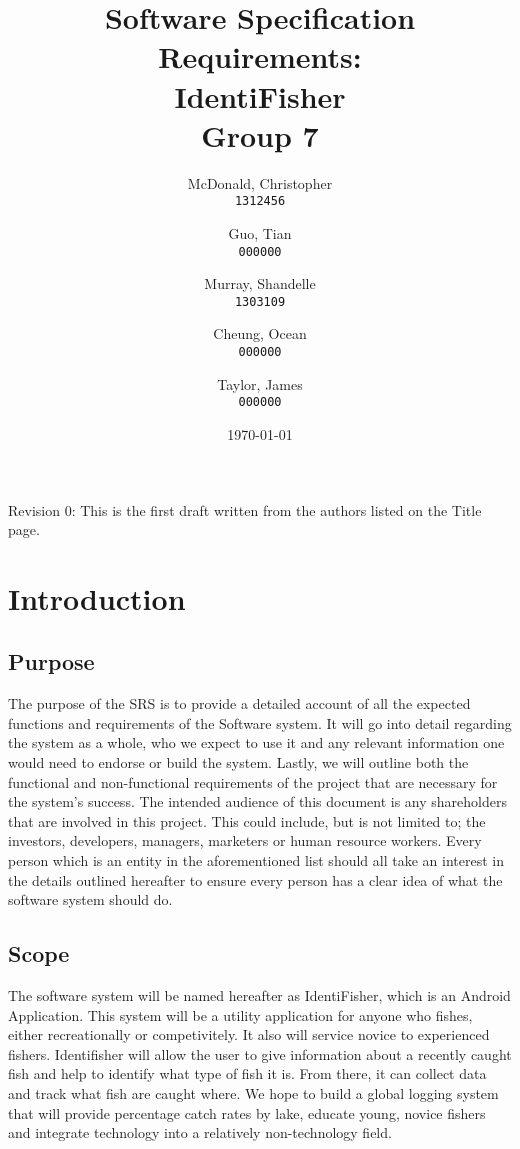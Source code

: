 \documentclass{article}
\title{Software Specification Requirements: \\ IdentiFisher \\ Group 7}
\author{
McDonald, Christopher\\
\texttt{1312456}
\and
Guo, Tian\\
\texttt{000000}
\and
Murray, Shandelle\\
\texttt{1303109}
\and
Cheung, Ocean\\
\texttt{000000}
\and
Taylor, James\\
\texttt{000000}
}
\date{\today}
\begin{document}
\maketitle

\newpage

\tableofcontents

\vspace*{\fill}
Revision 0: This is the first draft written from the authors listed on the Title page.

\section{Introduction}

\subsection{Purpose}
The purpose of the SRS is to provide a detailed account of all the expected functions
and requirements of the Software system. It will go into detail regarding the system
as a whole, who we expect to use it and any relevant information one would need
to endorse or build the system. Lastly, we will outline both the functional and
non-functional requirements of the project that are necessary for the system's
success. The intended audience of this document is any shareholders that are involved in this
project. This could include, but is not limited to; the investors, developers, managers,
marketers or human resource workers. Every person which is an entity in the aforementioned
list should all take an interest in the details outlined hereafter to ensure every person
has a clear idea of what the software system should do.

\subsection{Scope}
The software system will be named hereafter as IdentiFisher, which is an Android Application.
This system will be a utility application for anyone who fishes, either recreationally or
competivitely. It also will service novice to experienced fishers. Identifisher will allow
the user to give information about a recently caught fish and help to identify what type
of fish it is. From there, it can collect data and track what fish are caught where. We
hope to build a global logging system that will provide percentage catch rates by lake,
educate young, novice fishers and integrate technology into a relatively non-technology field.
\end{document}
